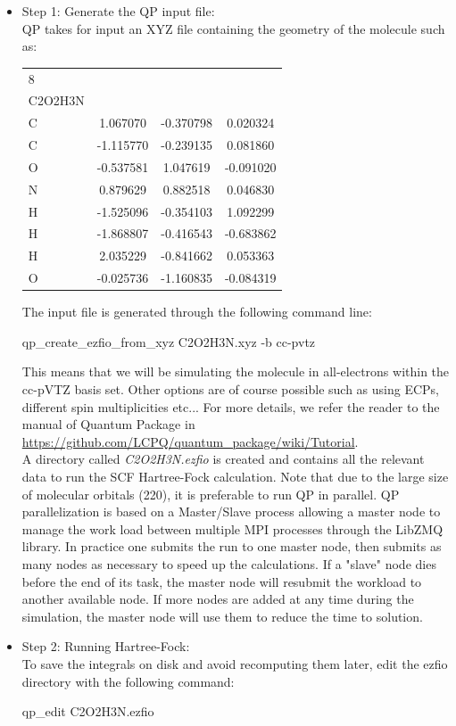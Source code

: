 \begin{itemize}
\item Step 1: Generate the QP input file:\\
QP takes for input an XYZ file containing the geometry of the molecule such as:

\begin{center}
\begin{tabular}{ l c c c }
8\\
C2O2H3N\\
C &       1.067070 &  -0.370798 &   0.020324\\
C &      -1.115770 &  -0.239135 &   0.081860\\
O &      -0.537581 &   1.047619 &  -0.091020\\
N &       0.879629 &   0.882518 &   0.046830\\
H &      -1.525096 &  -0.354103 &   1.092299\\
H &      -1.868807 &  -0.416543 &  -0.683862\\
H &       2.035229 &  -0.841662 &   0.053363\\
O &      -0.025736 &  -1.160835 &  -0.084319   
\end{tabular}
\end{center}

The input file is generated through the following command line:\\

\begin{shade}
qp_create_ezfio_from_xyz C2O2H3N.xyz -b cc-pvtz 
\end{shade}

 
This means that we will be simulating the molecule in all-electrons within the cc-pVTZ basis set. Other options are of course possible such as using ECPs, different spin multiplicities etc... For more details, we refer the reader to the manual of Quantum Package in \url{https://github.com/LCPQ/quantum_package/wiki/Tutorial}.\\
A directory called \textit{C2O2H3N.ezfio} is created and contains all the relevant data to run the SCF Hartree-Fock calculation. Note that due to the large size of molecular orbitals (220), it is preferable to run QP in parallel. QP parallelization is based on a Master/Slave process allowing a master node to manage the work load between multiple MPI processes through the LibZMQ library. In practice one submits the run to one master node, then submits as many nodes as necessary to speed up the calculations. If a "slave" node dies before the end of its task, the master node will resubmit the workload to another available node. If more nodes are added at any time during the simulation, the master node will use them to reduce the time to solution.\\
\item Step 2: Running Hartree-Fock:\\
To save the integrals on disk and avoid recomputing them later, edit the ezfio directory with the following command:\\
\begin{shade}
qp_edit C2O2H3N.ezfio 
\end{shade}


\end{itemize}
